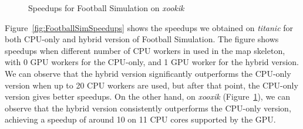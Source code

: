 \documentclass[final]{jfp1}
\begin{document}
\begin{figure}[t]
\centering
{}
 \caption{Speedups for Football Simulation on \emph{xookik}}
 \label{fig:FootballSimSpeedupsXookik}
\end{figure}

Figure~\ref{fig:FootballSimSpeedups} shows the speedups we obtained on \emph{titanic} for both CPU-only and hybrid version of Football Simulation. The figure 
shows speedups when different number of CPU workers in used in the map skeleton, with
0 GPU workers for the CPU-only, and 1 GPU worker for the hybrid version. We can observe that the hybrid version
significantly outperforms the CPU-only version when up to 20 CPU workers are used, but after
that point, the CPU-only version gives better speedups. On the other hand, on \emph{xooxik} (Figure~\ref{fig:FootballSimSpeedupsXookik}), we can observe that the hybrid version consistently outperforms the CPU-only version, achieving a speedup of around 10 on 11 CPU cores supported by the GPU.
 
\end{document}
